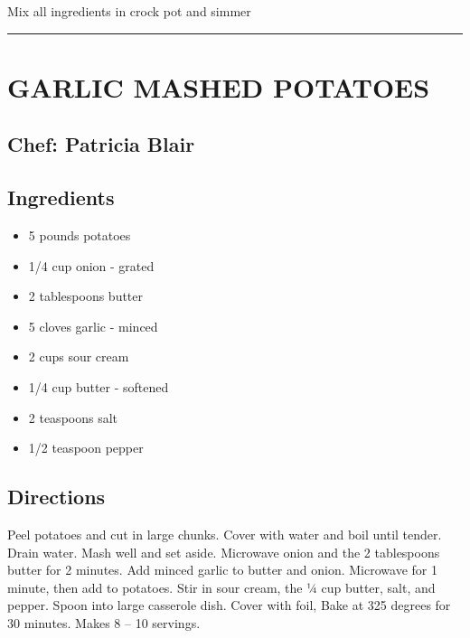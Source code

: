 \documentclass[
]{book}
\providecommand{\tightlist}{%
  \setlength{\itemsep}{0pt}\setlength{\parskip}{0pt}}
\begin{document}
Mix all ingredients in crock pot and simmer

\begin{center}\rule{0.5\linewidth}{0.5pt}\end{center}

\hypertarget{garlic-mashed-potatoes}{%
\section*{GARLIC MASHED POTATOES}\label{garlic-mashed-potatoes}}


\hypertarget{chef-patricia-blair-8}{%
\subsection*{Chef: Patricia Blair}\label{chef-patricia-blair-8}}


\hypertarget{ingredients-30}{%
\subsection*{Ingredients}\label{ingredients-30}}


\begin{itemize}
\tightlist
\item
  5 pounds potatoes
\item
  1/4 cup onion - grated
\item
  2 tablespoons butter
\item
  5 cloves garlic - minced
\item
  2 cups sour cream
\item
  1/4 cup butter - softened
\item
  2 teaspoons salt
\item
  1/2 teaspoon pepper
\end{itemize}

\hypertarget{directions-30}{%
\subsection*{Directions}\label{directions-30}}


Peel potatoes and cut in large chunks. Cover with water and boil until tender.
Drain water. Mash well and set aside. Microwave onion and the 2 tablespoons
butter for 2 minutes. Add minced garlic to butter and onion. Microwave for
1 minute, then add to potatoes. Stir in sour cream, the ¼ cup butter, salt, and pepper.
Spoon into large casserole dish. Cover with foil, Bake at 325 degrees for 30 minutes.
Makes 8 -- 10 servings.
\end{document}
